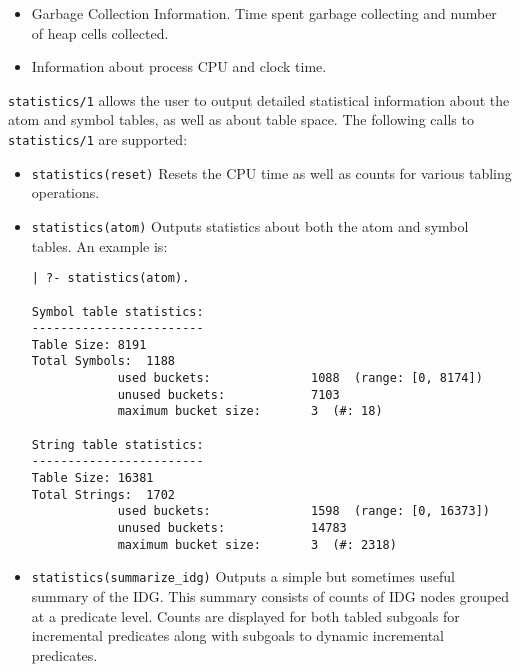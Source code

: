 \begin{description}
\begin{itemize}
\item Garbage Collection Information.  Time spent garbage collecting
  and number of heap cells collected.

\item Information about process CPU and clock time.
\end{itemize}



%
{\tt statistics/1} allows the user to output detailed statistical
information about the atom and symbol tables, as well as about table
space.  The following calls to {\tt statistics/1} are supported:
%
\begin{itemize}
\item {\tt statistics(reset)}  Resets the CPU time as well as counts
for various tabling operations. 
%
\item {\tt statistics(atom)} Outputs statistics about both the atom
and symbol tables.  An example is: 
%
{\footnotesize
\begin{verbatim}
| ?- statistics(atom).

Symbol table statistics:
------------------------
Table Size:	8191
Total Symbols:	1188
            used buckets:              1088  (range: [0, 8174])
            unused buckets:            7103
            maximum bucket size:       3  (#: 18)

String table statistics:
------------------------
Table Size:	16381
Total Strings:	1702
            used buckets:              1598  (range: [0, 16373])
            unused buckets:            14783
            maximum bucket size:       3  (#: 2318)
\end{verbatim}}

\item {\tt statistics(summarize\_idg)} Outputs a simple but sometimes
useful summary of the IDG.  This summary consists of counts of IDG
nodes grouped at a predicate level.  Counts are displayed for both
tabled subgoals for incremental predicates along with subgoals to
dynamic incremental predicates.


\end{itemize}
\end{description}
